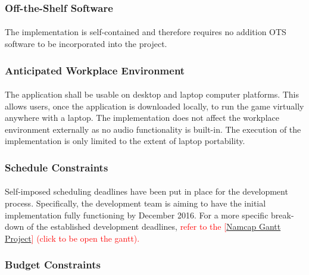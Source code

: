 \documentclass[12pt, titlepage]{article}
\begin{document}
\subsubsection{Off-the-Shelf Software}
\paragraph{}
The implementation is self-contained and therefore requires no addition OTS software to be incorporated into the project.

\subsubsection{Anticipated Workplace Environment}
\paragraph{}
The application shall be usable on desktop and laptop computer platforms. This allows users, once the application is downloaded locally, to run the game virtually anywhere with a laptop. The implementation does not affect the workplace environment externally as no audio functionality is built-in. The execution of the implementation is only limited to the extent of laptop portability.
 
\subsubsection{Schedule Constraints}
\paragraph{}
Self-imposed scheduling deadlines have been put in place for the development process. Specifically, the development team is aiming to have the initial implementation fully functioning by December 2016. For a more specific break-down of the established development deadlines, \textcolor{red}{refer to the [\href{run:../DevelopmentPlan/NamcapGanttProject.gan}{Namcap Gantt Project}] (click to be open the gantt).}

\subsubsection{Budget Constraints}
\end{document}
